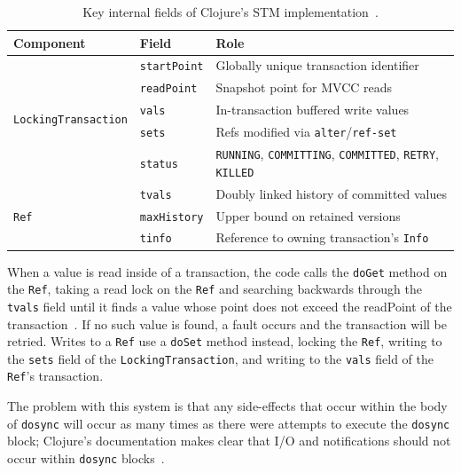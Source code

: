 \begin{table}[htbp]
  \centering
  \small
  \begin{tabular}{lll}
    \toprule
    \textbf{Component} & \textbf{Field}      & \textbf{Role}                                     \\
    \midrule
    \multirow{5}{*}{\texttt{LockingTransaction}}
                       & \texttt{startPoint} & Globally unique transaction identifier            \\
                       & \texttt{readPoint}  & Snapshot point for MVCC reads                     \\
                       & \texttt{vals}       & In-transaction buffered write values              \\
                       & \texttt{sets}       & Refs modified via \texttt{alter}/\texttt{ref-set} \\
                       & \texttt{status}     & \texttt{RUNNING}, \texttt{COMMITTING},
    \texttt{COMMITTED}, \texttt{RETRY}, \texttt{KILLED}                                          \\
    \midrule
    \multirow{3}{*}{\texttt{Ref}}
                       & \texttt{tvals}      & Doubly linked history of committed values         \\
                       & \texttt{maxHistory} & Upper bound on retained versions                  \\
                       & \texttt{tinfo}      & Reference to owning transaction's \texttt{Info}   \\
    \bottomrule
  \end{tabular}
  \caption{Key internal fields of Clojure's STM implementation~\cite{jensen2016}.}
  \label{tab:clojure-stm}
\end{table}

When a value is read inside of a transaction, the code calls the
\texttt{doGet} method on the \texttt{Ref}, taking a read lock on the
\texttt{Ref} and searching backwards through the \texttt{tvals} field
until it finds a value whose point does not exceed the readPoint of the
transaction~\cite{jensen2016}. If no such value is found, a fault occurs
and the transaction will be retried. Writes to a \texttt{Ref} use a
\texttt{doSet} method instead, locking the \texttt{Ref}, writing to the
\texttt{sets} field of the \texttt{LockingTransaction}, and writing to
the \texttt{vals} field of the \texttt{Ref}'s transaction.

The problem with this system is that any side-effects that occur within
the body of \texttt{dosync} will occur as many times as there were
attempts to execute the \texttt{dosync} block; Clojure's documentation
makes clear that I/O and notifications should not occur within
\texttt{dosync} blocks~\cite{clojureRefs}.


